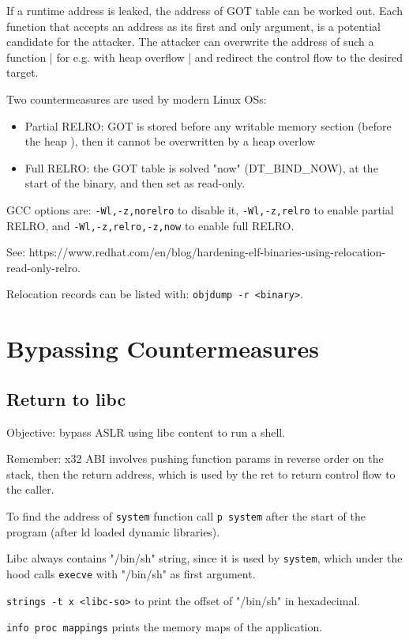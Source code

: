 If a runtime address is leaked, the address of GOT table can be worked out.
Each function that accepts an address as its first and only argument, is a potential candidate for the attacker.
The attacker can overwrite the address of such a function | for e.g. with heap overflow | and redirect the control flow to the desired target.

Two countermeasures are used by modern Linux OSs:
\begin{itemize}
  \item Partial RELRO: GOT is stored before any writable memory section (before the heap ), then it cannot be overwritten by a heap overlow
  \item Full RELRO: the GOT table is solved "now" (DT_BIND_NOW), at the start of the binary, and then set as read-only.
\end{itemize}

GCC options are: \texttt{-Wl,-z,norelro} to disable it, \texttt{-Wl,-z,relro} to enable partial RELRO, and \texttt{-Wl,-z,relro,-z,now} to enable full RELRO.

See: https://www.redhat.com/en/blog/hardening-elf-binaries-using-relocation-read-only-relro.

Relocation records can be listed with: \texttt{objdump -r <binary>}.

\section{Bypassing Countermeasures}
\subsection{Return to libc}
Objective: bypass ASLR using libc content to run a shell.

Remember: x32 ABI involves pushing function params in reverse order on the stack, then the return address, which is used by the ret to return control flow to the caller.

To find the address of \texttt{system} function call \texttt{p system} after the start of the program (after ld loaded dynamic libraries).

Libc always contains "/bin/sh" string, since it is used by \texttt{system}, which under the hood calls \texttt{execve} with "/bin/sh" as first argument.

\texttt{strings -t x <libc-so>} to print the offset of "/bin/sh" in hexadecimal.

\texttt{info proc mappings} prints the memory maps of the application.

